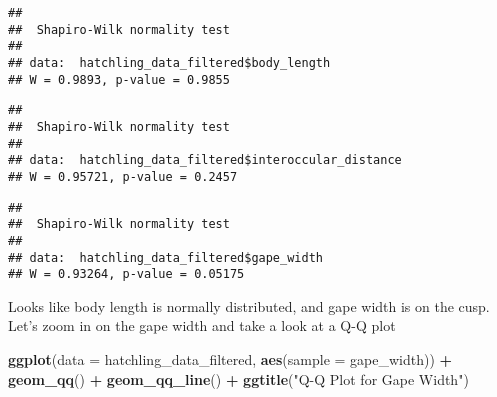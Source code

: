 \documentclass[
]{article}
\newenvironment{Shaded}{\begin{snugshade}}{\end{snugshade}}
\newcommand{\AttributeTok}[1]{\textcolor[rgb]{0.13,0.29,0.53}{#1}}
\newcommand{\FunctionTok}[1]{\textcolor[rgb]{0.13,0.29,0.53}{\textbf{#1}}}
\newcommand{\NormalTok}[1]{#1}
\newcommand{\SpecialCharTok}[1]{\textcolor[rgb]{0.81,0.36,0.00}{\textbf{#1}}}
\newcommand{\StringTok}[1]{\textcolor[rgb]{0.31,0.60,0.02}{#1}}
\begin{document}
\begin{Shaded}
\end{Shaded}

\begin{verbatim}
## 
##  Shapiro-Wilk normality test
## 
## data:  hatchling_data_filtered$body_length
## W = 0.9893, p-value = 0.9855
\end{verbatim}

\begin{Shaded}
\end{Shaded}

\begin{verbatim}
## 
##  Shapiro-Wilk normality test
## 
## data:  hatchling_data_filtered$interoccular_distance
## W = 0.95721, p-value = 0.2457
\end{verbatim}

\begin{Shaded}
\end{Shaded}

\begin{verbatim}
## 
##  Shapiro-Wilk normality test
## 
## data:  hatchling_data_filtered$gape_width
## W = 0.93264, p-value = 0.05175
\end{verbatim}

Looks like body length is normally distributed, and gape width is on the
cusp. Let's zoom in on the gape width and take a look at a Q-Q plot

\begin{Shaded}
\begin{Highlighting}[]
\FunctionTok{ggplot}\NormalTok{(}\AttributeTok{data =}\NormalTok{ hatchling\_data\_filtered, }\FunctionTok{aes}\NormalTok{(}\AttributeTok{sample =}\NormalTok{ gape\_width)) }\SpecialCharTok{+}
  \FunctionTok{geom\_qq}\NormalTok{() }\SpecialCharTok{+}
  \FunctionTok{geom\_qq\_line}\NormalTok{() }\SpecialCharTok{+}
  \FunctionTok{ggtitle}\NormalTok{(}\StringTok{"Q{-}Q Plot for Gape Width"}\NormalTok{)}
\end{Highlighting}
\end{Shaded}
\end{document}
